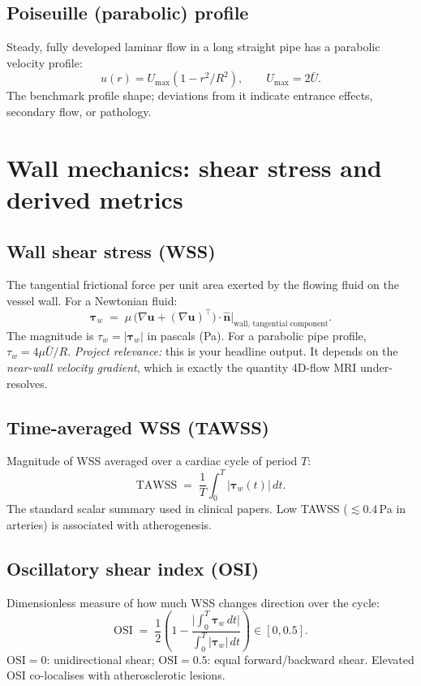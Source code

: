 \documentclass[11pt]{article}
\begin{document}
\subsection*{Poiseuille (parabolic) profile}
Steady, fully developed laminar flow in a long straight pipe has a parabolic velocity profile:
\[
u(r) = U_{\max}\!\left(1 - r^2/R^2\right), \qquad U_{\max} = 2\bar{U}.
\]
The benchmark profile shape; deviations from it indicate entrance effects, secondary flow, or pathology.

\section{Wall mechanics: shear stress and derived metrics}

\subsection*{Wall shear stress (WSS)}
The tangential frictional force per unit area exerted by the flowing fluid on the vessel wall. For a Newtonian fluid:
\[
\boldsymbol{\tau}_w \;=\; \mu \, \big(\nabla \mathbf{u} + (\nabla\mathbf{u})^\top\big) \cdot \hat{\mathbf{n}}\Big|_{\text{wall, tangential component}}.
\]
The magnitude is $\tau_w = |\boldsymbol{\tau}_w|$ in pascals (Pa). For a parabolic pipe profile, $\tau_w = 4\mu \bar{U}/R$. \textit{Project relevance:} this is your headline output. It depends on the \emph{near-wall velocity gradient}, which is exactly the quantity 4D-flow MRI under-resolves.

\subsection*{Time-averaged WSS (TAWSS)}
Magnitude of WSS averaged over a cardiac cycle of period $T$:
\[
\mathrm{TAWSS} \;=\; \frac{1}{T}\int_0^T |\boldsymbol{\tau}_w(t)| \, dt.
\]
The standard scalar summary used in clinical papers. Low TAWSS ($\lesssim 0.4$\,Pa in arteries) is associated with atherogenesis.

\subsection*{Oscillatory shear index (OSI)}
Dimensionless measure of how much WSS changes direction over the cycle:
\[
\mathrm{OSI} \;=\; \frac{1}{2}\!\left( 1 - \frac{\big|\int_0^T \boldsymbol{\tau}_w \, dt\big|}{\int_0^T |\boldsymbol{\tau}_w| \, dt} \right) \in [0, 0.5].
\]
$\mathrm{OSI}=0$: unidirectional shear; $\mathrm{OSI}=0.5$: equal forward/backward shear. Elevated OSI co-localises with atherosclerotic lesions.
\end{document}

